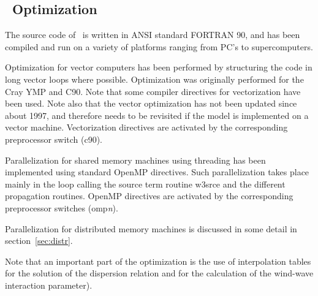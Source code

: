 
\vssub
\subsection{~Optimization} \label{sec:optim}
\vssub

The source code of \ws\ is written in ANSI standard FORTRAN 90, and has been
compiled and run on a variety of platforms ranging from PC's to
supercomputers.

Optimization for vector computers has been performed by structuring the code
in long vector loops where possible. Optimization was originally performed for
the Cray YMP and C90. Note that some compiler directives for vectorization
have been used. Note also that the vector optimization has not been updated
since about 1997, and therefore needs to be revisited if the model is
implemented on a vector machine. Vectorization directives are activated by the
corresponding preprocessor switch ({\F c90}).

Parallelization for shared memory machines using threading has been
implemented using standard OpenMP directives. Such parallelization takes place
mainly in the loop calling the source term routine {\F w3srce} and the
different propagation routines. OpenMP directives are activated by the
corresponding preprocessor switches ({\F omp}{\it n}).

Parallelization for distributed memory machines is discussed in some detail in
section~\ref{sec:distr}.

Note that an important part of the optimization is the use of interpolation
tables for the solution of the dispersion relation and for the calculation of
the wind-wave interaction parameter).
